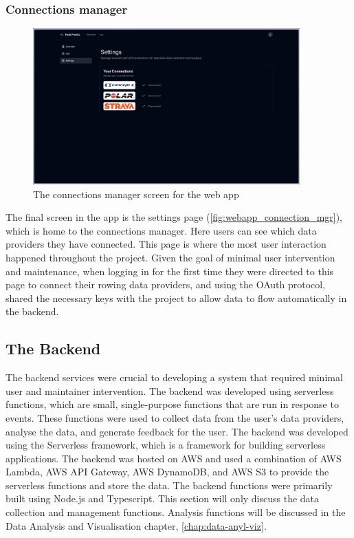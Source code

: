 \subsubsection{Connections manager}

\begin{figure}[htbp]
  \centering
  \includegraphics[height=6cm]{figures/fyp_connections_page.jpeg}
  \captionsetup{justification=centering}
  \caption[Web app Connections Manager]{\label{fig:webapp_connection_mgr}The connections manager screen for the web app} 
\end{figure}
The final screen in the app is the settings page (\autoref{fig:webapp_connection_mgr}), which is home to the connections manager. Here users can see which data providers they have connected. This page is where the most user interaction happened throughout the project. Given the goal of minimal user intervention and maintenance, when logging in for the first time they were directed to this page to connect their rowing data providers, and using the OAuth protocol, shared the necessary keys with the project to allow data to flow automatically in the backend.  

\subsection{The Backend}
The backend services were crucial to developing a system that required minimal user and maintainer intervention. The backend was developed using serverless functions, which are small, single-purpose functions that are run in response to events. These functions were used to collect data from the user's data providers, analyse the data, and generate feedback for the user. The backend was developed using the Serverless framework, which is a framework for building serverless applications. The backend was hosted on AWS and used a combination of AWS Lambda, AWS API Gateway, AWS DynamoDB, and AWS S3 to provide the serverless functions and store the data. The backend functions were primarily built using Node.js and Typescript. This section will only discuss the data collection and management functions. Analysis functions will be discussed in the Data Analysis and Visualisation chapter, \autoref{chap:data-anyl-viz}.

